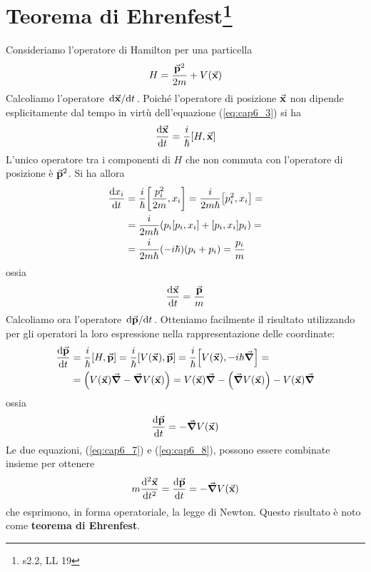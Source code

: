 \documentclass[a4paper,12pt,oneside]{book}
\begin{document}
\section[Teorema di Ehrenfest]{Teorema di Ehrenfest\footnote{s2.2, LL 19}}
Consideriamo l'operatore di Hamilton per una particella
\begin{equation}
  H= \frac{\va{p}^2}{2m} + V\qty(\va{x})
\end{equation}
Calcoliamo l'operatore $\dv*{\va{x}}{t}$. Poiché l'operatore di posizione $\va{x}$ non dipende esplicitamente dal tempo in virtù dell'equazione (\ref{eq:cap6_3}) si ha
\begin{equation}
  \dv{\va{x}}{t} = \frac{i}{\hbar}\comm{H}{\va{x}}
\end{equation}
L'unico operatore tra i componenti di $H$ che non commuta con l'operatore di posizione è $\va{p}^2$. Si ha allora
\begin{align}
  \dv{x_i}{t} &= \frac{i}{\hbar}\comm{\frac{p_i^2}{2m}}{x_i} = \frac{i}{2m\hbar}\comm{p_i^2}{x_i} =\nonumber\\
  &= \frac{i}{2m\hbar}\qty(p_i\comm{p_i}{x_i}+\comm{p_i}{x_i}p_i)=\nonumber\\
  &= \frac{i}{2m\hbar}\qty(-i\hbar)\qty(p_i+p_i)= \frac{p_i}{m}
\end{align}
ossia
\begin{equation}
  \label{eq:cap6_7}
  \dv{\va{x}}{t} = \frac{\va{p}}{m}
\end{equation}
Calcoliamo ora l'operatore $\dv*{\va{p}}{t}$. Otteniamo facilmente il risultato utilizzando per gli operatori la loro espressione nella rappresentazione delle coordinate:
\begin{align}
  \dv{\va{p}}{t}&=\frac{i}{\hbar}\comm{H}{\va{p}}=\frac{i}{\hbar}\comm{V\qty(\va{x})}{\va{p}}=\frac{i}{\hbar}\comm{V\qty(\va{x})}{-i\hbar\va{\grad}}=\nonumber\\
  &= \qty(V\qty(\va{x})\va{\grad}-\va{\grad}V\qty(\va{x})) = V\qty(\va{x})\va{\grad} - \qty(\va{\grad}V\qty(\va{x}))- V\qty(\va{x})\va{\grad}
\end{align}
ossia
\begin{equation}
  \label{eq:cap6_8}
  \dv{\va{p}}{t} = -\va{\grad}V\qty(\va{x})
\end{equation}
Le due equazioni, (\ref{eq:cap6_7}) e (\ref{eq:cap6_8}), possono essere combinate insieme per ottenere
\begin{equation}
  m\dv[2]{\va{x}}{t} = \dv{\va{p}}{t} = -\va{\grad}V\qty(\va{x})
\end{equation}
che esprimono, in forma operatoriale, la legge di Newton. Questo risultato è noto come \textbf{teorema di Ehrenfest}.
\end{document}
